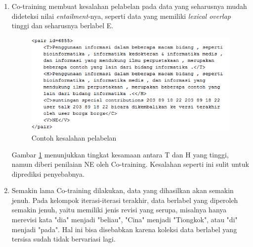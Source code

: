 \begin{enumerate}
	\item Co-training membuat kesalahan pelabelan pada data yang seharusnya mudah dideteksi nilai \textit{entailment}-nya, seperti data yang memiliki \textit{lexical overlap} tinggi dan seharusnya berlabel E.
	\begin{figure}
		\centering
		\includegraphics[width=0.85\linewidth]{pics/kasus-2}
		\caption{Contoh kesalahan pelabelan}
		\label{pic:kasus-2}
	\end{figure}
	\noindent Gambar \ref{pic:kasus-2} menunjukkan tingkat kesamaan antara T dan H yang tinggi, namun diberi penilaian NE oleh Co-training. Kesalahan seperti ini sulit untuk diprediksi penyebabnya.	
	\item Semakin lama Co-training dilakukan, data yang dihasilkan akan semakin jenuh. Pada kelompok iterasi-iterasi terakhir, data berlabel yang diperoleh semakin jenuh, yaitu memiliki jenis revisi yang serupa, misalnya hanya merevisi kata "dia" menjadi "beliau", "Cina" menjadi "Tiongkok", atau "di" menjadi "pada". Hal ini bisa disebabkan karena koleksi data berlabel yang tersisa sudah tidak bervariasi lagi.
\end{enumerate}

